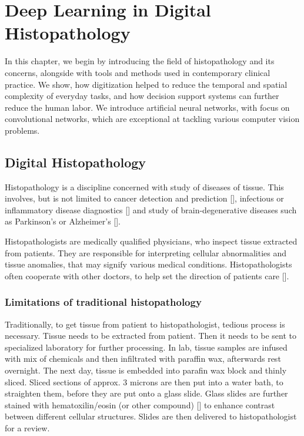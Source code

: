\chapter{Deep Learning in Digital Histopathology}

In this chapter, we begin by introducing the field of histopathology and its concerns, alongside with tools and methods used in contemporary clinical practice. We show, how digitization helped to reduce the temporal and spatial complexity of everyday tasks, and how decision support systems can further reduce the human labor. We introduce artificial neural networks, with focus on convolutional networks, which are exceptional at tackling various computer vision problems.

\section{Digital Histopathology}

Histopathology is a discipline concerned with study of diseases of tissue. This involves, but is not limited to cancer detection and prediction [], infectious or inflammatory disease diagnostics [] and study of brain-degenerative diseases such as Parkinson's or Alzheimer's [].

Histopathologists are medically qualified physicians, who inspect tissue extracted from patients. They are responsible for interpreting cellular abnormalities and tissue anomalies, that may signify various medical conditions. Histopathologists often cooperate with other doctors, to help set the direction of patients care [].

\subsection{Limitations of traditional histopathology}

Traditionally, to get tissue from patient to histopathologist, tedious process is necessary. Tissue needs to be extracted from patient. Then it needs to be sent to specialized laboratory for further processing. In lab, tissue samples are infused with mix of chemicals and then infiltrated with paraffin wax, afterwards rest overnight. The next day, tissue is embedded into parafin wax block and thinly sliced. Sliced sections of approx. $3$ microns are then put into a water bath, to straighten them, before they are put onto a glass slide. Glass slides are further stained with hematoxilin/eosin (or other compound) [] to enhance contrast between different cellular structures. Slides are then delivered to histopathologist for a review.

